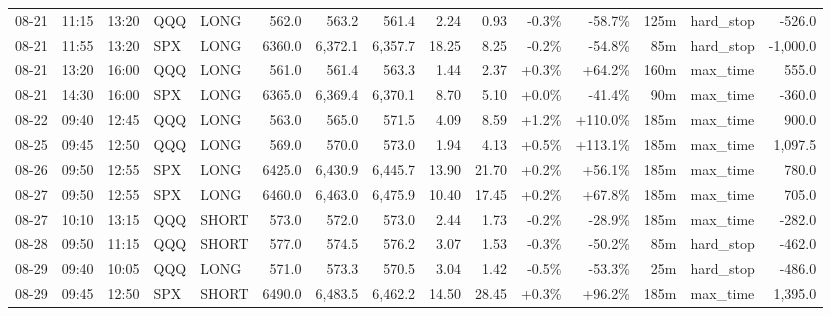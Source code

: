 \documentclass[11pt,a4paper,twoside]{article}
\begin{document}
\begin{landscape}
\begin{center}
\begin{longtable}{>{\color{txtmain}}l l l l l r r r r r r r r >{\color{txtmain}}l r}
08-21 & 11:15 & 13:20 & QQQ & LONG & 562.0 & 563.2 & 561.4 & 2.24 & 0.93 & \textcolor{lossred}{-0.3\%} & \textcolor{lossred}{-58.7\%} & 125m & hard\_stop & \textcolor{lossred}{-526.0} \\
08-21 & 11:55 & 13:20 & SPX & LONG & 6360.0 & 6,372.1 & 6,357.7 & 18.25 & 8.25 & \textcolor{lossred}{-0.2\%} & \textcolor{lossred}{-54.8\%} & 85m & hard\_stop & \textcolor{lossred}{-1,000.0} \\
08-21 & 13:20 & 16:00 & QQQ & LONG & 561.0 & 561.4 & 563.3 & 1.44 & 2.37 & \textcolor{wingreen}{+0.3\%} & \textcolor{wingreen}{+64.2\%} & 160m & max\_time & \textcolor{wingreen}{555.0} \\
08-21 & 14:30 & 16:00 & SPX & LONG & 6365.0 & 6,369.4 & 6,370.1 & 8.70 & 5.10 & \textcolor{wingreen}{+0.0\%} & \textcolor{lossred}{-41.4\%} & 90m & max\_time & \textcolor{lossred}{-360.0} \\
08-22 & 09:40 & 12:45 & QQQ & LONG & 563.0 & 565.0 & 571.5 & 4.09 & 8.59 & \textcolor{wingreen}{+1.2\%} & \textcolor{wingreen}{+110.0\%} & 185m & max\_time & \textcolor{wingreen}{900.0} \\
08-25 & 09:45 & 12:50 & QQQ & LONG & 569.0 & 570.0 & 573.0 & 1.94 & 4.13 & \textcolor{wingreen}{+0.5\%} & \textcolor{wingreen}{+113.1\%} & 185m & max\_time & \textcolor{wingreen}{1,097.5} \\
08-26 & 09:50 & 12:55 & SPX & LONG & 6425.0 & 6,430.9 & 6,445.7 & 13.90 & 21.70 & \textcolor{wingreen}{+0.2\%} & \textcolor{wingreen}{+56.1\%} & 185m & max\_time & \textcolor{wingreen}{780.0} \\
08-27 & 09:50 & 12:55 & SPX & LONG & 6460.0 & 6,463.0 & 6,475.9 & 10.40 & 17.45 & \textcolor{wingreen}{+0.2\%} & \textcolor{wingreen}{+67.8\%} & 185m & max\_time & \textcolor{wingreen}{705.0} \\
08-27 & 10:10 & 13:15 & QQQ & SHORT & 573.0 & 572.0 & 573.0 & 2.44 & 1.73 & \textcolor{lossred}{-0.2\%} & \textcolor{lossred}{-28.9\%} & 185m & max\_time & \textcolor{lossred}{-282.0} \\
08-28 & 09:50 & 11:15 & QQQ & SHORT & 577.0 & 574.5 & 576.2 & 3.07 & 1.53 & \textcolor{lossred}{-0.3\%} & \textcolor{lossred}{-50.2\%} & 85m & hard\_stop & \textcolor{lossred}{-462.0} \\
08-29 & 09:40 & 10:05 & QQQ & LONG & 571.0 & 573.3 & 570.5 & 3.04 & 1.42 & \textcolor{lossred}{-0.5\%} & \textcolor{lossred}{-53.3\%} & 25m & hard\_stop & \textcolor{lossred}{-486.0} \\
08-29 & 09:45 & 12:50 & SPX & SHORT & 6490.0 & 6,483.5 & 6,462.2 & 14.50 & 28.45 & \textcolor{wingreen}{+0.3\%} & \textcolor{wingreen}{+96.2\%} & 185m & max\_time & \textcolor{wingreen}{1,395.0} \\

\end{longtable}
\end{center}
\end{landscape}
\end{document}
